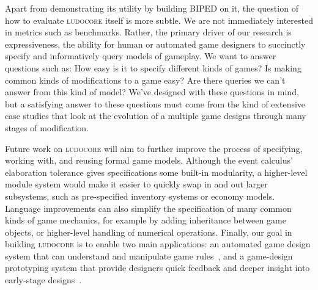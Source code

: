 \documentclass[conference]{IEEEtran}
\newcommand{\ludocore}{\textsc{ludocore}}
\begin{document}
Apart from demonstrating its utility by building BIPED on it, the question of
how to evaluate \ludocore{} itself is more subtle. We are not immediately
interested in metrics such as benchmarks. Rather, the primary driver of our
research is expressiveness, the ability for human or automated game designers
to succinctly specify and informatively query models of gameplay. We want to
answer questions such as: How easy is it to specify different kinds of games?
Is making common kinds of modifications to a game easy? Are there queries we
can't answer from this kind of model? We've designed with these questions in
mind, but a satisfying answer to these questions must come from the kind of
extensive case studies that look at the evolution of a multiple game designs
through many stages of modification.

Future work on \ludocore{} will aim to further improve the process of
specifying, working with, and reusing formal game models. Although the event
calculus' elaboration tolerance gives specifications some built-in modularity,
a higher-level module system would make it easier to quickly swap in and out
larger subsystems, such as pre-specified inventory systems or economy models.
Language improvements can also simplify the specification of many common kinds
of game mechanics, for example by adding inheritance between game objects, or
higher-level handling of numerical operations.  Finally, our goal in building
\ludocore{} is to enable two main applications: an automated game design system
that can understand and manipulate game rules~\citep{VF}, and a game-design
prototyping system that provide designers quick feedback and deeper insight
into early-stage designs~\citep{FDG09}. 



\end{document}

